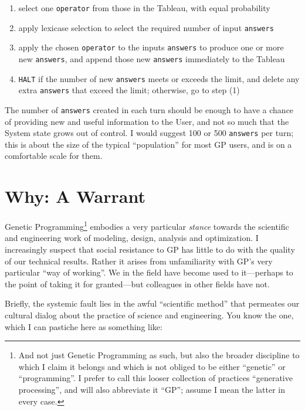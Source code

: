 \begin{enumerate}
\item select one {\tt operator} from those in the Tableau, with equal probability
\item apply lexicase selection to select the required number of input {\tt answers}
\item apply the chosen {\tt operator} to the inputs {\tt answers} to produce one or more new {\tt answers}, and append those new {\tt answers} immediately to the Tableau
\item {\tt HALT} if the number of new {\tt answers} meets or exceeds the limit, and delete any extra {\tt answers} that exceed the limit; otherwise, go to step (1)
\end{enumerate}

The number of {\tt answers} created in each turn should be enough to have a chance of providing new and useful information to the User, and not so much that the System state grows out of control. I would suggest 100 or 500 {\tt answers} per turn; this is about the size of the typical ``population'' for most GP users, and is on a comfortable scale for them.

\section{Why: A Warrant}\hypertarget{why-a-warrant}{}\label{why-a-warrant}

Genetic Programming\footnote{And not just Genetic Programming as such, but also the broader discipline to which I claim it belongs and which is not obliged to be either ``genetic'' or ``programming''. I prefer to call this looser collection of practices ``generative processing'', and will also abbreviate it ``GP''; assume I mean the latter in every case.} embodies a very particular \emph{stance} towards the scientific and engineering work of modeling, design, analysis and optimization. I increasingly suspect that social resistance to GP has little to do with the quality of our technical results. Rather it arises from unfamiliarity with GP's very particular ``way of working''. We in the field have become used to it---perhaps to the point of taking it for granted---but colleagues in other fields have not.

Briefly, the systemic fault lies in the awful ``scientific method'' that permeates our cultural dialog about the practice of science and engineering. You know the one, which I can pastiche here as something like:

